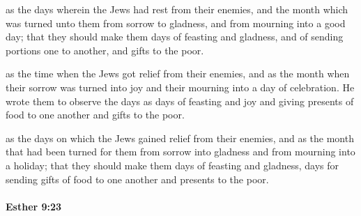 			\begin{versebox}
					\item[BHS] 
					\item[LXX] 
					\item[ASV] as the days wherein the Jews had rest from their enemies, and the month which was turned unto them from sorrow to gladness, and from mourning into a good day; that they should make them days of feasting and gladness, and of sending portions one to another, and gifts to the poor.
					\item[NIV] as the time when the Jews got relief from their enemies, and as the month when their sorrow was turned into joy and their mourning into a day of celebration. He wrote them to observe the days as days of feasting and joy and giving presents of food to one another and gifts to the poor.
					\item[NRSV] as the days on which the Jews gained relief from their enemies, and as the month that had been turned for them from sorrow into gladness and from mourning into a holiday; that they should make them days of feasting and gladness, days for sending gifts of food to one another and presents to the poor.
			\end{versebox}

		\paragraph{Esther 9:23} %
			\label{ESTHER-9-23}

